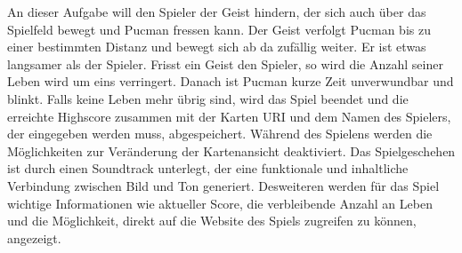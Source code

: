\documentclass[11pt,a4paper]{article}
\begin{document}
An dieser Aufgabe will den Spieler der Geist hindern, der sich auch über das Spielfeld bewegt und Pucman fressen kann. Der Geist verfolgt Pucman bis zu einer bestimmten Distanz und bewegt sich ab da zufällig weiter. Er ist etwas langsamer als der Spieler. Frisst ein Geist den Spieler, so wird %
die Anzahl seiner Leben wird um eins verringert. Danach ist Pucman kurze Zeit unverwundbar und blinkt.
Falls keine Leben mehr übrig sind, wird das Spiel beendet und die erreichte Highscore zusammen mit der Karten URI und dem Namen des Spielers, der eingegeben werden muss, abgespeichert.
Während des Spielens werden die Möglichkeiten zur Veränderung der Kartenansicht deaktiviert. 
Das Spielgeschehen ist durch einen Soundtrack unterlegt, der eine funktionale und inhaltliche Verbindung zwischen Bild und Ton generiert.
Desweiteren werden für das Spiel wichtige Informationen wie aktueller Score, die verbleibende Anzahl an Leben und die Möglichkeit, direkt auf die Website des Spiels zugreifen zu können, angezeigt.
\clearpage
\end{document}
